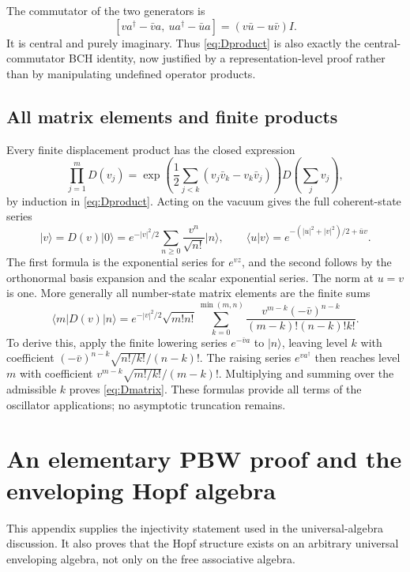 \documentclass[11pt]{article}
\numberwithin{equation}{section}
\theoremstyle{definition}
\theoremstyle{remark}
\begin{document}
The commutator of the two generators is
\[
 [v a^\dagger-\bar v a,\ u a^\dagger-\bar u a]
 =(v\bar u-u\bar v)I.
\]
It is central and purely imaginary. Thus \eqref{eq:Dproduct} is
also exactly the central-commutator BCH identity, now justified by
a representation-level proof rather than by manipulating undefined
operator products.

\subsection{All matrix elements and finite products}
Every finite displacement product has the closed expression
\begin{equation}\label{eq:Dmulti}
 \prod_{j=1}^mD(v_j)
 =\exp\left(\frac12\sum_{j<k}
           (v_j\bar v_k-v_k\bar v_j)\right)
        D\left(\sum_jv_j\right),
\end{equation}
by induction in \eqref{eq:Dproduct}. Acting on the vacuum gives the
full coherent-state series
\begin{equation}\label{eq:coherent}
 |v\rangle=D(v)|0\rangle
 =e^{-|v|^2/2}\sum_{n\geq0}\frac{v^n}{\sqrt{n!}}|n\rangle,
 \qquad
 \langle u|v\rangle=
 e^{-(|u|^2+|v|^2)/2+\bar u v}.
\end{equation}
The first formula is the exponential series for $e^{vz}$, and the
second follows by the orthonormal basis expansion and the scalar
exponential series. The norm at $u=v$ is one.
More generally all number-state matrix elements are the finite sums
\begin{equation}\label{eq:Dmatrix}
 \boxed{\displaystyle
 \langle m|D(v)|n\rangle
 =e^{-|v|^2/2}\sqrt{m!n!}
   \sum_{k=0}^{\min(m,n)}
   \frac{v^{m-k}(-\bar v)^{n-k}}
        {(m-k)!(n-k)!k!}.}
\end{equation}
To derive this, apply the finite lowering series
$e^{-\bar v a}$ to $|n\rangle$, leaving level $k$ with coefficient
$(-\bar v)^{n-k}\sqrt{n!/k!}/(n-k)!$.
The raising series $e^{v a^\dagger}$ then reaches level $m$ with
coefficient $v^{m-k}\sqrt{m!/k!}/(m-k)!$. Multiplying and summing
over the admissible $k$ proves \eqref{eq:Dmatrix}.
These formulas provide all terms of the oscillator applications;
no asymptotic truncation remains.

\appendix
\section{An elementary PBW proof and the enveloping Hopf algebra}
\label{sec:pbw}
This appendix supplies the injectivity statement used in the
universal-algebra discussion. It also proves that the Hopf structure
exists on an arbitrary universal enveloping algebra, not only on
the free associative algebra.
\end{document}
